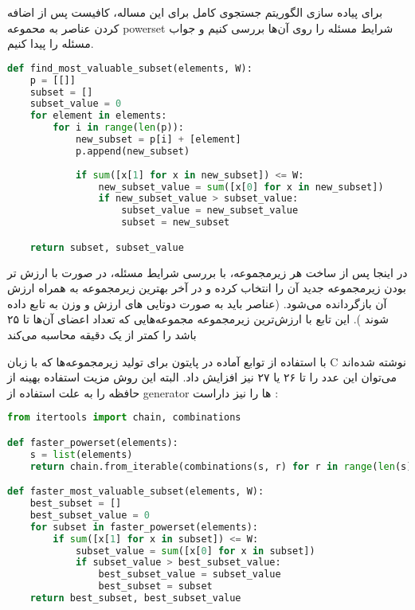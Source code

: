 \documentclass[]{article}
\begin{document}
برای پیاده سازی الگوریتم جستجوی کامل برای این مساله، کافیست پس از اضافه کردن
عناصر به محموعه powerset
شرایط مسئله را روی آن‌ها بررسی کنیم و جواب مسئله را پیدا کنیم.

\begin{latin}
\begin{lstlisting}[language=Python, caption=Python Knapsack Problem Implementation]
def find_most_valuable_subset(elements, W):
    p = [[]]
    subset = []
    subset_value = 0
    for element in elements:
        for i in range(len(p)):
            new_subset = p[i] + [element]
            p.append(new_subset)
            
            if sum([x[1] for x in new_subset]) <= W:
                new_subset_value = sum([x[0] for x in new_subset])
                if new_subset_value > subset_value:
                    subset_value = new_subset_value
                    subset = new_subset

    return subset, subset_value
\end{lstlisting}
\end{latin}

در اینجا پس از ساخت هر زیرمجموعه، با بررسی شرایط مسئله، در صورت با ارزش تر بودن
زیرمجموعه جدید آن را انتخاب کرده و در آخر بهترین زیرمجموعه به همراه ارزش آن بازگردانده می‌شود.
(عناصر باید به صورت دوتایی های ارزش و وزن به تابع داده شوند ).
این تابع با ارزش‌ترین زیرمجموعه مجموعه‌هایی که تعداد اعضای آن‌ها تا ۲۵ باشد را کمتر از یک دقیقه محاسبه می‌کند

با استفاده از توابع آماده در پایتون برای تولید زیرمجموعه‌ها که با زبان C نوشته شده‌اند
می‌توان این عدد را تا ۲۶ یا ۲۷ نیز افزایش داد. البته این روش مزیت استفاده بهینه از حافظه را به علت استفاده از
generator ها را نیز داراست :

\begin{latin}
\begin{lstlisting}[language=Python, caption=Python Faster Knapsack Problem Implementation]
from itertools import chain, combinations

def faster_powerset(elements):
    s = list(elements)
    return chain.from_iterable(combinations(s, r) for r in range(len(s)+1))

def faster_most_valuable_subset(elements, W):
    best_subset = []
    best_subset_value = 0
    for subset in faster_powerset(elements):
        if sum([x[1] for x in subset]) <= W:
            subset_value = sum([x[0] for x in subset])
            if subset_value > best_subset_value:
                best_subset_value = subset_value
                best_subset = subset
    return best_subset, best_subset_value
\end{lstlisting}
\end{latin}
\end{document}
